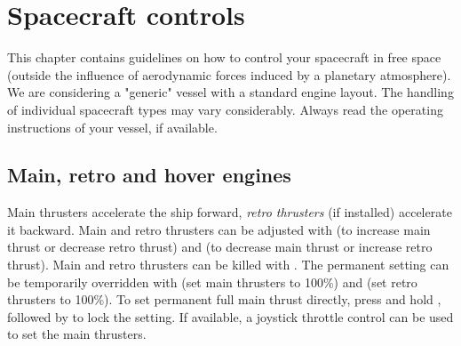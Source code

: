 \documentclass[Orbiter User Manual.tex]{subfiles}
\begin{document}
\section{Spacecraft controls}
\label{sec:controls}
This chapter contains guidelines on how to control your spacecraft in free space
(outside the influence of aerodynamic forces induced by a planetary atmosphere).
We are considering a "generic" vessel with a standard engine layout. The
handling of individual spacecraft types may vary considerably. Always read the
operating instructions of your vessel, if available.

\subsection{Main, retro and hover engines}
Main thrusters accelerate the ship forward, \emph{retro thrusters} (if
installed) accelerate it backward. Main and retro thrusters can be adjusted
with \keystroke{\ctrl,+}\num{} (to increase main thrust or decrease retro
thrust) and \keystroke{\ctrl,-}\num{} (to decrease main thrust or increase
retro thrust). Main and retro thrusters can be killed with
\keystroke{\ctrl,*}\num{}. The permanent setting can be temporarily overridden
with \keystroke{+}\num{} (set main thrusters to 100\%) and
\keystroke{-}\num{} (set retro thrusters to 100\%). To set permanent full main
thrust directly, press and hold \keystroke{+}\num{}, followed by \Ctrl{} to lock
the setting. If available, a joystick throttle control can be used to set the
main thrusters.
\end{document}
